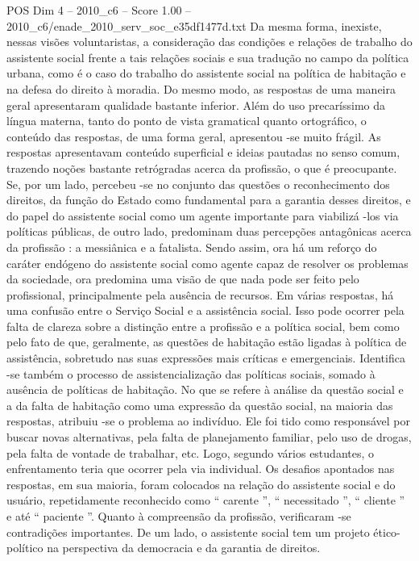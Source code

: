 \begin{textsample}{POS Dim 4 – 2010\_c6 – Score 1.00 – 2010\_c6/enade\_2010\_serv\_soc\_e35df1477d.txt}
Da mesma forma, inexiste, nessas visões voluntaristas, a consideração das condições e relações de trabalho do assistente social frente a tais relações sociais e sua tradução no campo da política urbana, como é o caso do trabalho do assistente social na política de habitação e na defesa do direito à moradia.
Do mesmo modo, as respostas de uma maneira geral apresentaram qualidade bastante inferior.
Além do uso precaríssimo da língua materna, tanto do ponto de vista gramatical quanto ortográfico, o conteúdo das respostas, de uma forma geral, apresentou -se muito frágil.
As respostas apresentavam conteúdo superficial e ideias pautadas no senso comum, trazendo noções bastante retrógradas acerca da profissão, o que é preocupante.
Se, por um lado, percebeu -se no conjunto das questões o reconhecimento dos direitos, da função do Estado como fundamental para a garantia desses direitos, e do papel do assistente social como um agente importante para viabilizá -los via políticas públicas, de outro lado, predominam duas percepções antagônicas acerca da profissão : a messiânica e a fatalista.
Sendo assim, ora há um reforço do caráter endógeno do assistente social como agente capaz de resolver os problemas da sociedade, ora predomina uma visão de que nada pode ser feito pelo profissional, principalmente pela ausência de recursos.
Em várias respostas, há uma confusão entre o Serviço Social e a assistência social.
Isso pode ocorrer pela falta de clareza sobre a distinção entre a profissão e a política social, bem como pelo fato de que, geralmente, as questões de habitação estão ligadas à política de assistência, sobretudo nas suas expressões mais críticas e emergenciais.
Identifica -se também o processo de assistencialização das políticas sociais, somado à ausência de políticas de habitação.
No que se refere à análise da questão social e a da falta de habitação como uma expressão da questão social, na maioria das respostas, atribuiu -se o problema ao indivíduo.
Ele foi tido como responsável por buscar novas alternativas, pela falta de planejamento familiar, pelo uso de drogas, pela falta de vontade de trabalhar, etc.
Logo, segundo vários estudantes, o enfrentamento teria que ocorrer pela via individual.
Os desafios apontados nas respostas, em sua maioria, foram colocados na relação do assistente social e do usuário, repetidamente reconhecido como “ carente ”, “ necessitado ”, “ cliente ” e até “ paciente ”.
Quanto à compreensão da profissão, verificaram -se contradições importantes.
De um lado, o assistente social tem um projeto ético-político na perspectiva da democracia e da garantia de direitos.

\end{textsample}
